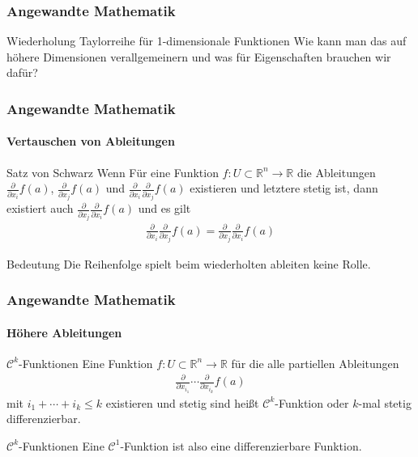 \documentclass{beamer}
\begin{document}
\begin{frame}
    \frametitle{Angewandte Mathematik}


    \begin{block}{Wiederholung Taylorreihe für 1-dimensionale Funktionen}
        Wie kann man das auf höhere Dimensionen verallgemeinern und was für Eigenschaften brauchen wir dafür?
        \end{block}
\end{frame}


\begin{frame}
    \frametitle{Angewandte Mathematik}
\framesubtitle{Vertauschen von Ableitungen}
    \begin{block}{Satz von Schwarz}
Wenn Für eine Funktion $f:  U \subset \mathbb{R}^n \to \mathbb{R}$ die Ableitungen $\frac{\partial}{\partial x_i} f(a)$, $\frac{\partial}{\partial x_j}f(a)$ und $ \frac{\partial}{\partial x_i}\frac{\partial }{\partial x_j} f(a)$ existieren und letztere stetig ist, dann existiert auch $ \frac{\partial}{\partial x_j}\frac{\partial }{\partial x_i} f(a)$ und es gilt
\begin{align*}
\frac{\partial}{\partial x_i}\frac{\partial }{\partial x_j} f(a) = \frac{\partial}{\partial x_j}\frac{\partial }{\partial x_i} f(a)
\end{align*}
\end{block}
    \begin{block}{Bedeutung}
Die Reihenfolge spielt beim wiederholten ableiten keine Rolle.
\end{block}
 \end{frame}



\begin{frame}
    \frametitle{Angewandte Mathematik}
\framesubtitle{Höhere Ableitungen}
    \begin{block}{$\mathcal{C}^k$-Funktionen}
Eine  Funktion  $f: U \subset \mathbb{R}^n \to \mathbb{R}$ für die alle partiellen Ableitungen 
\begin{align*}
 \frac{\partial}{\partial x_{i_1}} \cdots   \frac{\partial}{\partial x_{i_k}} f(a)
\end{align*}
mit $i_1 + \cdots + i_k \leq k$ existieren und stetig sind heißt $\mathcal{C}^k$-Funktion oder $k$-mal stetig differenzierbar.
\end{block}
    \begin{block}{$\mathcal{C}^k$-Funktionen}
 Eine  $\mathcal{C}^1$-Funktion ist also eine differenzierbare Funktion.
\end{block}
 \end{frame}
\end{document}

